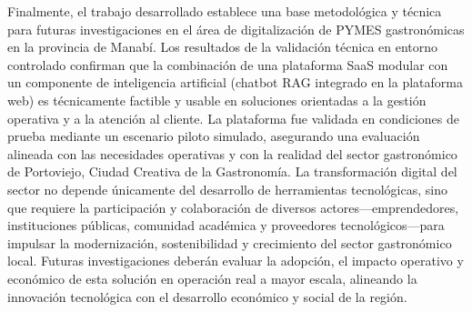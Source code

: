 Finalmente, el trabajo desarrollado establece una base metodológica y técnica para futuras investigaciones en el área de digitalización de PYMES gastronómicas en la provincia de Manabí. Los resultados de la validación técnica en entorno controlado confirman que la combinación de una plataforma SaaS modular con un componente de inteligencia artificial (chatbot RAG integrado en la plataforma web) es técnicamente factible y usable en soluciones orientadas a la gestión operativa y a la atención al cliente. La plataforma fue validada en condiciones de prueba mediante un escenario piloto simulado, asegurando una evaluación alineada con las necesidades operativas y con la realidad del sector gastronómico de Portoviejo, Ciudad Creativa de la Gastronomía. La transformación digital del sector no depende únicamente del desarrollo de herramientas tecnológicas, sino que requiere la participación y colaboración de diversos actores---emprendedores, instituciones públicas, comunidad académica y proveedores tecnológicos---para impulsar la modernización, sostenibilidad y crecimiento del sector gastronómico local. Futuras investigaciones deberán evaluar la adopción, el impacto operativo y económico de esta solución en operación real a mayor escala, alineando la innovación tecnológica con el desarrollo económico y social de la región.
